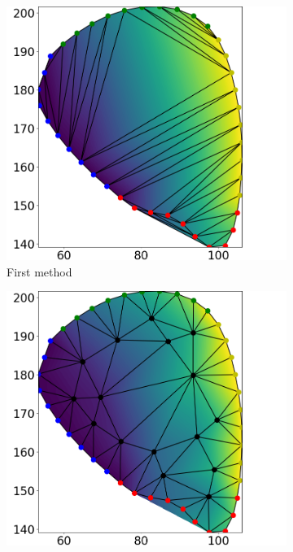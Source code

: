 \begin{figure}%
  \centering%
  \hspace{0.24\textwidth}
  \begin{subfigure}[t]{0.24\textwidth}%
    \centering%
    \includegraphics[width=\textwidth]{images/fiber_creation/u_0.png}%
    \caption{First method}%
    \label{fig:tu_0}%
  \end{subfigure}
  \begin{subfigure}[t]{0.24\textwidth}%
    \centering%
    \includegraphics[width=\textwidth]{images/fiber_creation/u_1.png}%

\end{subfigure}
\end{figure}
